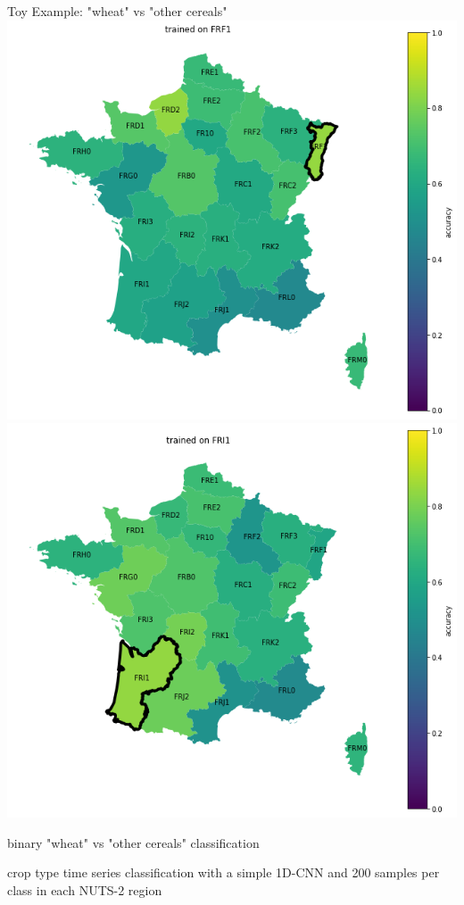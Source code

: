 \documentclass[11pt]{beamer}
\begin{document}
	\begin{frame}{Toy Example: "wheat" vs "other cereals"}
		\includegraphics[width=.49\textwidth]{images/francecrops/frf1.png}
		\includegraphics[width=.49\textwidth]{images/francecrops/fri1.png}
		
		\vspace{1em}
		binary "wheat" vs "other cereals" classification
		
		\vspace{1em}
		{\small 
			crop type time series classification with a simple 1D-CNN and 200 samples per class	in each NUTS-2 region
		}
	\end{frame}
\end{document}
